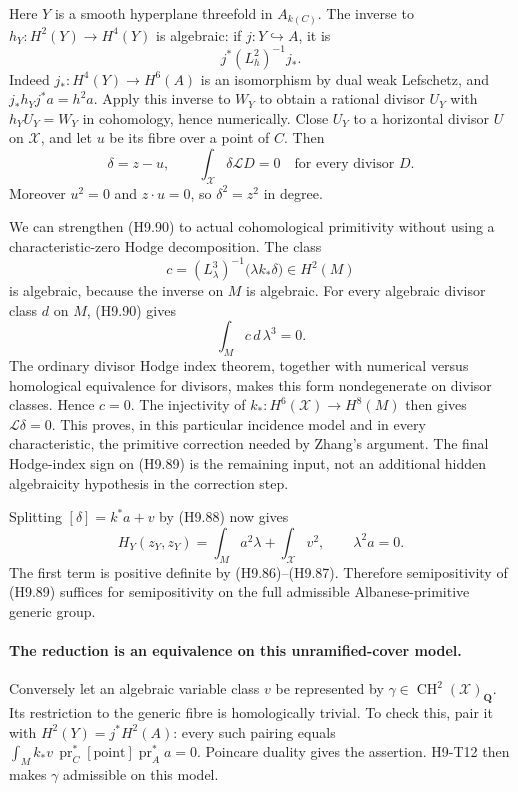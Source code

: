 Here $Y$ is a smooth hyperplane threefold in $A_{k(C)}$.
The inverse to $h_Y:H^2(Y)\to H^4(Y)$ is algebraic: if
$j:Y\hookrightarrow A$, it is
\[
                     j^*(L_h^2)^{-1}j_*.
\]
Indeed $j_*:H^4(Y)\to H^6(A)$ is an isomorphism by dual weak
Lefschetz, and $j_*h_Yj^*a=h^2a$. Apply this inverse to $W_Y$
to obtain a rational divisor $U_Y$ with
$h_YU_Y=W_Y$ in cohomology, hence numerically. Close $U_Y$ to
a horizontal divisor $U$ on $\mathcal X$, and let $u$ be its
fibre over a point of $C$. Then
\[
        \delta=z-u,\qquad
        \int_{\mathcal X}\delta\mathcal L D=0
                         \quad\text{for every divisor }D.  \tag{H9.90}
\]
Moreover $u^2=0$ and $z\cdot u=0$, so $\delta^2=z^2$ in degree.

We can strengthen (H9.90) to actual cohomological primitivity
without using a characteristic-zero Hodge decomposition. The
class
\[
       c=(L_\lambda^3)^{-1}\bigl(\lambda k_*\delta\bigr)
                                        \in H^2(M)
\]
is algebraic, because the inverse on $M$ is algebraic. For every
algebraic divisor class $d$ on $M$, (H9.90) gives
\[
                  \int_M c\,d\,\lambda^3=0.
\]
The ordinary divisor Hodge index theorem, together with numerical
versus homological equivalence for divisors, makes this form
nondegenerate on divisor classes. Hence $c=0$. The injectivity of
$k_*:H^6(\mathcal X)\to H^8(M)$ then gives
$\mathcal L\delta=0$.
This proves, in this particular incidence model and in every
characteristic, the primitive correction needed by Zhang's
argument. The final Hodge-index sign on (H9.89) is the remaining
input, not an additional hidden algebraicity hypothesis in the
correction step.

Splitting $[\delta]=k^*a+v$ by (H9.88) now gives
\[
 H_Y(z_Y,z_Y)
      =\int_M a^2\lambda+\int_{\mathcal X}v^2,
       \qquad \lambda^2a=0.                               \tag{H9.91}
\]
The first term is positive definite by (H9.86)--(H9.87).
Therefore semipositivity of (H9.89) suffices for semipositivity
on the full admissible Albanese-primitive generic group.

\paragraph{The reduction is an equivalence on this unramified-cover model.}
Conversely let an algebraic variable class $v$ be represented by
$\gamma\in\operatorname{CH}^2(\mathcal X)_{\mathbf Q}$.
Its restriction to the generic fibre is homologically trivial.
To check this, pair it with $H^2(Y)=j^*H^2(A)$: every such
pairing equals
$\int_Mk_*v\,\operatorname{pr}_C^*[\mathrm{point}]
                          \operatorname{pr}_A^*a=0$.
Poincare duality gives the assertion. H9-T12 then makes $\gamma$
admissible on this model.

